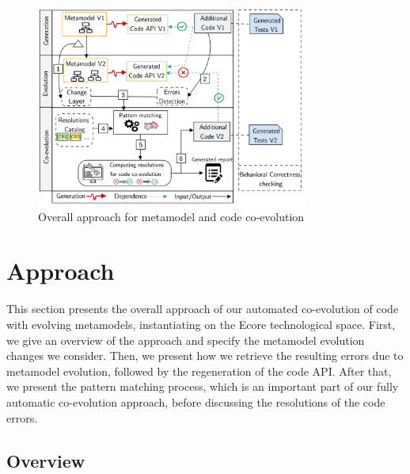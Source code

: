 

\begin{figure}[t]\centering%
	\centering
	\includegraphics[width=0.8\textwidth]{./pics/chapter1pics/ApproachV5.png}
	\caption{Overall approach for metamodel and code co-evolution}
	\label{fig:overallapproach}
	\vspace{-1em}
\end{figure}

\section{Approach}\label{approach}

This section presents the overall approach of our automated co-evolution of code with evolving metamodels,  instantiating on the Ecore technological space. First, we give an overview of the approach and specify the metamodel evolution changes we consider. 
%
Then, we present how we retrieve the resulting errors due to metamodel evolution, followed by the regeneration of the code API. 
After that, we present the pattern matching process, which is an important part of our fully automatic co-evolution approach, before discussing the resolutions of the code errors. 

\subsection{Overview}
\label{Overview}

